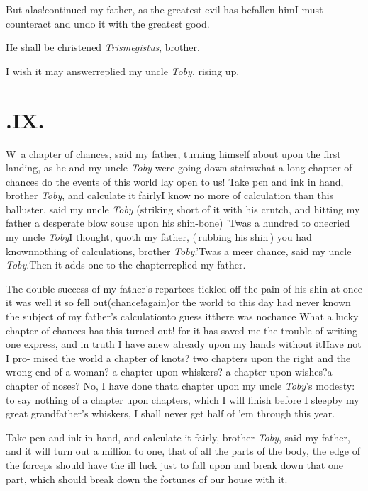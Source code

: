 \documentclass{article}
\begin{document}
But alas!\@ continued my father, as the greatest evil has befallen him\tsh I must
counteract and undo it with the greatest good.

He shall be christened \textit{Trismegistus}, brother.

I wish it may answer\tsh replied my uncle \textit{Toby}, rising up.

\smallskip
\section{.\enspace IX.}

\lettrine{W}{\,} a chapter of chances, said my father, turning himself about upon the
first landing, as he and my uncle \textit{Toby} were going
down stairs\tsh what a long
chapter of chances do the\pb
events of this world lay open to us!\break
Take pen and ink in hand, brother \textit{Toby}, and
calculate it fairly\tsk I know no more of calculation than
this balluster, said my uncle \textit{Toby} (striking short
of it with his crutch, and hitting my father a desperate
blow souse upon his shin-bone)\tsk\break
’Twas a hundred to one\tsk cried my uncle \textit{Toby}\tsh I thought, quoth my
father, (\,rubbing his shin\,) you had known\break nothing of
calculations, brother \textit{Toby}.\break \tsk ’Twas a meer chance,
said my uncle \textit{Toby}.\tsk Then it adds one to the
chapter\break\tsk replied my father.

The double success of my father’s re\-partees tickled off the pain of his shin at once
\tsk it was well it so fell out\tsk (chance!\@ again)\tsk or the world to this day had never
known the subject of my father’s calculation\tsk to guess
it\tsk there was no\pb chance\tsk
What a lucky chapter of chances has this turned out! for it
has saved me the trouble of writing one express, and in
truth I have anew already upon my hands without it\tsh Have
not I pro-\break 
mised the world a chapter of knots?\break
two chapters upon the right and the\break
wrong end of a woman? a chapter upon\break
whiskers? a chapter upon wishes?\tsk a chapter of noses?\tsk
No, I have done that\tsk a chapter upon my uncle
\textit{Toby}’s modesty: to say nothing of a chapter upon
chapters, which I will finish before I sleep\tsk by my great
grandfather’s whiskers, I shall never get half of ’em
through this year.

Take pen and ink in hand, and calculate it fairly, brother
\textit{Toby}, said my father, and it will turn out a
million to one, that of all the parts of the body, the edge\pb
of the forceps should have the ill luck just to fall upon
and break down that one part, which should break down the
fortunes of our house with it.
\end{document}
